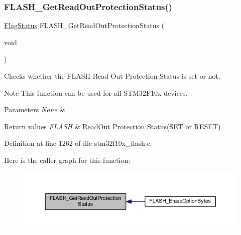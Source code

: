 \subsubsection{\texorpdfstring{F\+L\+A\+S\+H\+\_\+\+Get\+Read\+Out\+Protection\+Status()}{FLASH\_GetReadOutProtectionStatus()}}
{\footnotesize\ttfamily \hyperlink{group___exported__types_ga89136caac2e14c55151f527ac02daaff}{Flag\+Status} F\+L\+A\+S\+H\+\_\+\+Get\+Read\+Out\+Protection\+Status (\begin{DoxyParamCaption}\item[{void}]{ }\end{DoxyParamCaption})}



Checks whether the F\+L\+A\+SH Read Out Protection Status is set or not. 

\begin{DoxyNote}{Note}
This function can be used for all S\+T\+M32\+F10x devices. 
\end{DoxyNote}

\begin{DoxyParams}{Parameters}
{\em None} & \\
\hline
\end{DoxyParams}

\begin{DoxyRetVals}{Return values}
{\em F\+L\+A\+SH} & Read\+Out Protection Status(\+S\+E\+T or R\+E\+S\+E\+T) \\
\hline
\end{DoxyRetVals}


Definition at line 1262 of file stm32f10x\+\_\+flash.\+c.

Here is the caller graph for this function\+:
\nopagebreak
\begin{figure}[H]
\begin{center}
\leavevmode
\includegraphics[width=350pt]{group___f_l_a_s_h___exported___functions_ga57fe56770ff25b358f3e36bd70632e37_icgraph}
\end{center}
\end{figure}
\mbox{\label{group___f_l_a_s_h___exported___functions_gac265b8d1e7ea11e44ceee28797c3debb}} 
